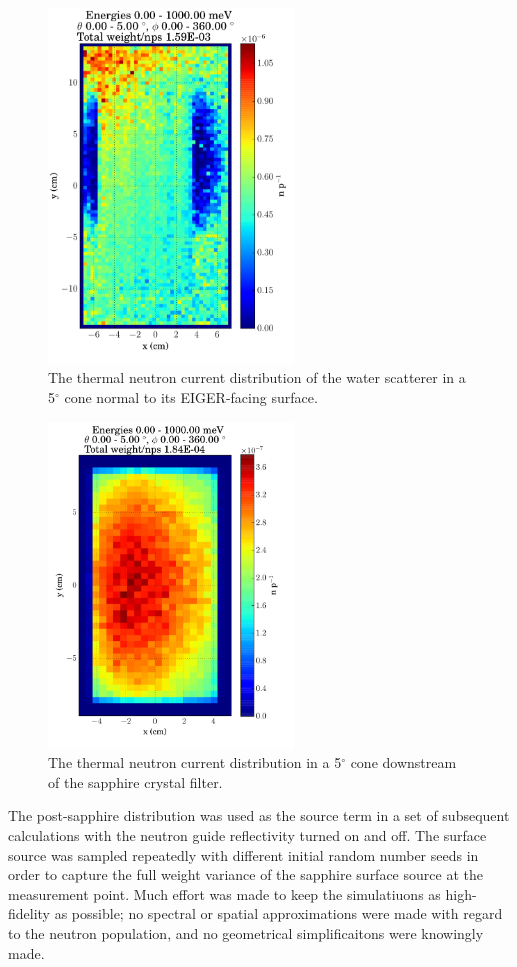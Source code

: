 \documentclass[a4paper,
              ]{jacow}
\begin{document}
\begin{figure}[!htb]
   \centering
   \includegraphics*[trim = 0mm 8mm 0mm 1.5mm, width=65mm]{graphics/wsdist.pdf}
   \caption{The thermal neutron current distribution of the water scatterer in a 5$^\circ$ cone normal to its EIGER-facing surface.}
   \label{wsdist}
\end{figure}

\begin{figure}[!htb]
   \centering
   \includegraphics*[trim = 0mm 8mm 0mm 2.5mm, width=65mm]{graphics/sappdist.pdf}
   \caption{The thermal neutron current distribution in a 5$^\circ$ cone downstream of the sapphire crystal filter.}
   \label{sappdist}
\end{figure}

The post-sapphire distribution was used as the source term in a set of subsequent calculations with the neutron guide reflectivity turned on and off.  The surface source was sampled repeatedly with different initial random number seeds in order to capture the full weight variance of the sapphire surface source at the measurement point.  Much effort was made to keep the simulatiuons as high-fidelity as possible; no spectral or spatial approximations were made with regard to the neutron population, and no geometrical simplificaitons were knowingly made.
\end{document}
